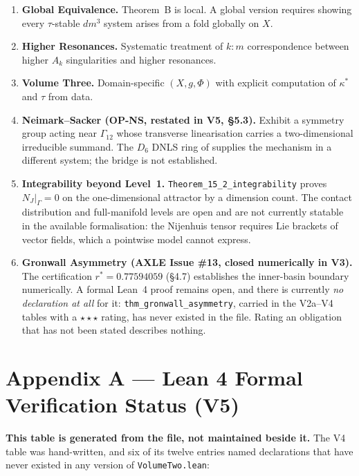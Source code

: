 \documentclass[11pt]{article}
\theoremstyle{boxed}
\begin{document}
\begin{enumerate}
  \item \textbf{Global Equivalence.} Theorem~B is local. A global version requires
        showing every $\tau$-stable $dm^3$ system arises from a fold globally on $X$.
  \item \textbf{Higher Resonances.} Systematic treatment of $k{:}m$ correspondence
        between higher $A_k$ singularities and higher resonances.
  \item \textbf{Volume Three.} Domain-specific $(X, g, \Phi)$ with explicit computation
        of $\kappa^{*}$ and $\tau$ from data.
  \item \textbf{Neimark--Sacker (OP-NS, restated in V5, \S 5.3).} Exhibit a symmetry group
        acting near $\Gamma_{12}$ whose transverse linearisation carries a two-dimensional
        irreducible summand. The $D_6$ DNLS ring of \cite{wp77} supplies the mechanism in a
        different system; the bridge is not established.
  \item \textbf{Integrability beyond Level~1.} \texttt{Theorem\_15\_2\_integrability} proves
        $N_J|_\Gamma = 0$ on the one-dimensional attractor by a dimension count. The contact
        distribution and full-manifold levels are open and are not currently statable in the
        available formalisation: the Nijenhuis tensor requires Lie brackets of vector fields, which
        a pointwise model cannot express.
  \item \textbf{Gronwall Asymmetry (AXLE Issue \#13, closed numerically in V3).} The
        certification $r^{*} = 0.77594059$ (\S 4.7) establishes the inner-basin boundary
        numerically. A formal Lean~4 proof remains open, and there is currently \emph{no
        declaration at all} for it: \texttt{thm\_gronwall\_asymmetry}, carried in the
        V2a--V4 tables with a $\star\star\star$ rating, has never existed in the file.
        Rating an obligation that has not been stated describes nothing.
\end{enumerate}

\section*{Appendix A --- Lean 4 Formal Verification Status (V5)}

\textbf{This table is generated from the file, not maintained beside it.} The V4 table was
hand-written, and six of its twelve entries named declarations that have never existed in any
version of \texttt{VolumeTwo.lean}:
\end{document}

